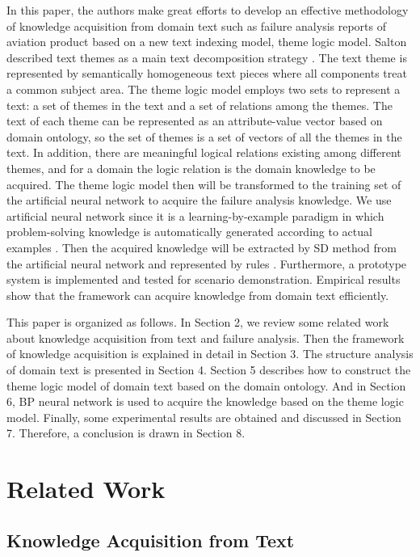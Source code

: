 \documentclass{elsart}
\begin{document}
In this paper, the authors make great efforts to develop an effective methodology of
knowledge acquisition from domain text such as failure analysis
reports of aviation product based on a new text indexing model, theme
logic model. Salton described text themes as a main text decomposition
strategy \cite{234834}. The text theme is represented by semantically
homogeneous text pieces where all components treat a common subject
area. The theme logic model employs two sets to represent a text: a
set of themes in the text and a set of relations among the themes. The
text of each theme can be represented as an attribute-value vector
based on domain ontology, so the set of themes is a set of vectors of
all the themes in the text. In addition, there are meaningful logical
relations existing among different themes, and for a domain the logic
relation is the domain knowledge to be acquired. The theme logic model
then will be transformed to the training set of the artificial neural
network to acquire the failure analysis knowledge. We use  artificial
neural network since it is a learning-by-example paradigm in which
problem-solving knowledge is automatically generated according to
actual examples \cite{Huang2002,Kim2004}. Then the acquired knowledge  will be extracted by SD method from the artificial neural network and represented by rules \cite{130346,Sestito1991}. Furthermore, a prototype system is implemented and tested for scenario demonstration. Empirical results show that the framework can acquire knowledge from domain text efficiently.

This paper is organized as follows. In Section 2, we review some related work about knowledge acquisition from text and failure analysis. Then the framework of knowledge acquisition is explained in detail in Section 3. The structure analysis of domain text is presented in Section 4. Section 5 describes how to construct the theme logic model of domain text based on the domain ontology. And in Section 6, BP neural network is used to acquire the knowledge based on the theme logic model. Finally,  some experimental results are obtained and discussed in Section 7. Therefore, a conclusion is drawn in Section 8. 

\section{Related Work
}
\label{sec:related-work}

\subsection{Knowledge Acquisition from Text
}
\label{sec:knowl-acqu-from}
\end{document}
